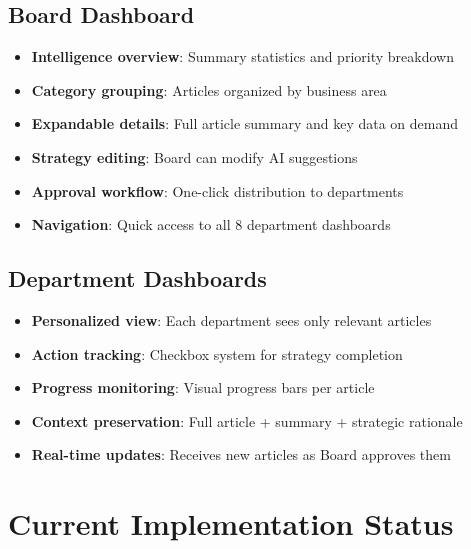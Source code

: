 \documentclass[11pt,a4paper]{article}
\begin{document}
\subsection{Board Dashboard}
\begin{itemize}[leftmargin=*]
    \item \textbf{Intelligence overview}: Summary statistics and priority breakdown
    \item \textbf{Category grouping}: Articles organized by business area
    \item \textbf{Expandable details}: Full article summary and key data on demand
    \item \textbf{Strategy editing}: Board can modify AI suggestions
    \item \textbf{Approval workflow}: One-click distribution to departments
    \item \textbf{Navigation}: Quick access to all 8 department dashboards
\end{itemize}

\subsection{Department Dashboards}
\begin{itemize}[leftmargin=*]
    \item \textbf{Personalized view}: Each department sees only relevant articles
    \item \textbf{Action tracking}: Checkbox system for strategy completion
    \item \textbf{Progress monitoring}: Visual progress bars per article
    \item \textbf{Context preservation}: Full article + summary + strategic rationale
    \item \textbf{Real-time updates}: Receives new articles as Board approves them
\end{itemize}

\section{Current Implementation Status}
\end{document}
